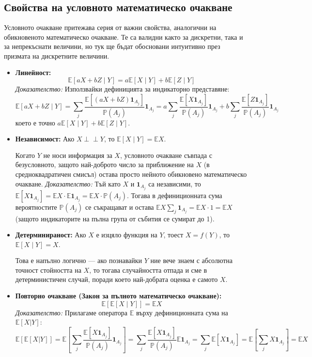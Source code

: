 \documentclass{article}
\begin{document}
\subsection{Свойства на условното математическо очакване}

Условното очакване притежава серия от важни свойства, аналогични на обикновеното математическо очакване. Те са валидни както за дискретни, така и за непрекъснати величини, но тук ще бъдат обосновани интуитивно през призмата на дискретните величини.

\begin{itemize}
    \item \textbf{Линейност:} 
    \[
    \mathbb{E}[aX + bZ \mid Y] = a\mathbb{E}[X \mid Y] + b\mathbb{E}[Z \mid Y]
    \]
    \emph{Доказателство:} Използвайки дефиницията за индикаторно представяне:
    \[
    \mathbb{E}[aX + bZ \mid Y] = \sum_j \frac{\mathbb{E}[(aX+bZ)\mathbf{1}_{A_j}]}{\mathbb{P}(A_j)}\mathbf{1}_{A_j} = a \sum_j \frac{\mathbb{E}[X\mathbf{1}_{A_j}]}{\mathbb{P}(A_j)}\mathbf{1}_{A_j} + b \sum_j \frac{\mathbb{E}[Z\mathbf{1}_{A_j}]}{\mathbb{P}(A_j)}\mathbf{1}_{A_j}
    \]
    което е точно $a\mathbb{E}[X \mid Y] + b\mathbb{E}[Z \mid Y]$.

    \item \textbf{Независимост:} Ако $X \perp\!\!\!\perp Y$, то $\mathbb{E}[X \mid Y] = \mathbb{E}X$.
    
    Когато $Y$ не носи информация за $X$, условното очакване съвпада с безусловното, защото най-доброто число за приближение на $X$ (в средноквадратичен смисъл) остава просто нейното обикновено математическо очакване.
    \emph{Доказателство:} Тъй като $X$ и $\mathbf{1}_{A_j}$ са независими, то $\mathbb{E}[X\mathbf{1}_{A_j}] = \mathbb{E}X \cdot \mathbb{E}\mathbf{1}_{A_j} = \mathbb{E}X \cdot \mathbb{P}(A_j)$. Тогава в дефиниционната сума вероятностите $\mathbb{P}(A_j)$ се съкращават и остава $\mathbb{E}X \sum_j \mathbf{1}_{A_j} = \mathbb{E}X \cdot 1 = \mathbb{E}X$ (защото индикаторите на пълна група от събития се сумират до 1).
    
    \item \textbf{Детерминираност:} Ако $X$ е изцяло функция на $Y$, тоест $X = f(Y)$, то $\mathbb{E}[X \mid Y] = X$.
    
    Това е напълно логично — ако познавайки $Y$ ние вече знаем с абсолютна точност стойността на $X$, то тогава случайността отпада и сме в детерминистичен случай, поради което най-добрата оценка е самото $X$.
    
    \item \textbf{Повторно очакване (Закон за пълното математическо очакване):}
    \[
    \mathbb{E}[\mathbb{E}[X \mid Y]] = \mathbb{E}X
    \]
    \emph{Доказателство:} Прилагаме оператора $\mathbb{E}$ върху дефиниционната сума на $\mathbb{E}[X|Y]$:
    \[
    \mathbb{E}[\mathbb{E}[X|Y]] = \mathbb{E}\left[\sum_j \frac{\mathbb{E}[X\mathbf{1}_{A_j}]}{\mathbb{P}(A_j)} \mathbf{1}_{A_j}\right] = \sum_j \frac{\mathbb{E}[X\mathbf{1}_{A_j}]}{\mathbb{P}(A_j)} \mathbb{E}\mathbf{1}_{A_j} = \sum_j \mathbb{E}[X\mathbf{1}_{A_j}] = \mathbb{E}\left[\sum_j X\mathbf{1}_{A_j}\right] = \mathbb{E}X
    \]
    

\end{itemize}
\end{document}

